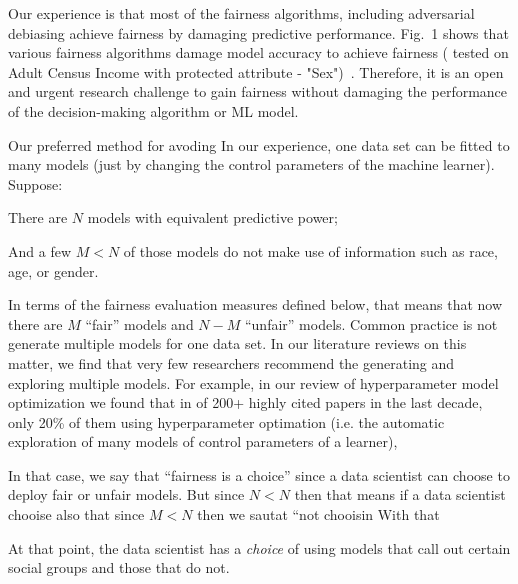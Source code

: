 Our experience is that most of the fairness algorithms, including
adversarial debiasing   achieve fairness by damaging
predictive performance.  Fig.~1 shows that various fairness algorithms damage model accuracy to achieve fairness ( tested on  Adult Census Income with protected attribute - "Sex")~\cite{IBM}.
Therefore, it is an open and urgent research challenge to gain fairness without damaging the performance of the decision-making algorithm or ML model. 

Our preferred method for avoding 
In our experience, one data set can be fitted
to many models (just by changing the control parameters of the machine learner). Suppose:
\bi
\item
There are
$N$ models with equivalent predictive power;
\item
And a few  $M<N$ of those models do not make use of information
such as race, age, or gender. 
\item
In terms of the fairness evaluation measures defined below,
that means that now there are $M$ ``fair'' models and $N-M$ ``unfair'' models. 
\ei
Common practice is not generate multiple models for one data set. In our literature
reviews on this matter, we find that very few researchers recommend
the generating and exploring multiple
models. For example, in our review of  hyperparameter model optimization  we found that in of 200+ highly cited papers in the last decade,
only 20\% of them using hyperparameter optimation (i.e. the automatic exploration
of many models of control
parameters of a learner),

In that case, we say that ``fairness is a choice'' since a data scientist can choose
to deploy fair or unfair models. But since $N<N$ then that means if a data scientist
chooise also that since $M<N$ then we sautat
``not chooisin
With that 


At that point, the data scientist has a {\em choice} of using
models that call out certain social groups and those that do not. 



